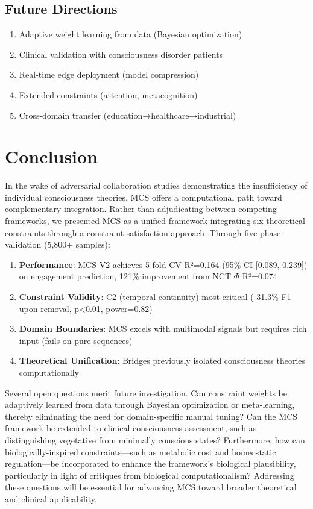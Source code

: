\documentclass[10pt,journal,compsoc]{IEEEtran}
\begin{document}
\subsection{Future Directions}

\begin{enumerate}
    \item Adaptive weight learning from data (Bayesian optimization)
    \item Clinical validation with consciousness disorder patients
    \item Real-time edge deployment (model compression)
    \item Extended constraints (attention, metacognition)
    \item Cross-domain transfer (education→healthcare→industrial)
\end{enumerate}

\section{Conclusion}
\label{sec:conclusion}

In the wake of adversarial collaboration studies demonstrating the insufficiency of individual consciousness theories, MCS offers a computational path toward complementary integration. Rather than adjudicating between competing frameworks, we presented MCS as a unified framework integrating six theoretical constraints through a constraint satisfaction approach. Through five-phase validation (5,800+ samples):

\begin{enumerate}
    \item \textbf{Performance}: MCS V2 achieves 5-fold CV R²=0.164 (95\% CI [0.089, 0.239]) on engagement prediction, 121\% improvement from NCT $\Phi$ R²=0.074
    \item \textbf{Constraint Validity}: C2 (temporal continuity) most critical (-31.3\% F1 upon removal, p<0.01, power=0.82)
    \item \textbf{Domain Boundaries}: MCS excels with multimodal signals but requires rich input (fails on pure sequences)
    \item \textbf{Theoretical Unification}: Bridges previously isolated consciousness theories computationally
\end{enumerate}

Several open questions merit future investigation. Can constraint weights be adaptively learned from data through Bayesian optimization or meta-learning, thereby eliminating the need for domain-specific manual tuning? Can the MCS framework be extended to clinical consciousness assessment, such as distinguishing vegetative from minimally conscious states? Furthermore, how can biologically-inspired constraints—such as metabolic cost and homeostatic regulation—be incorporated to enhance the framework's biological plausibility, particularly in light of critiques from biological computationalism? Addressing these questions will be essential for advancing MCS toward broader theoretical and clinical applicability.
\end{document}
